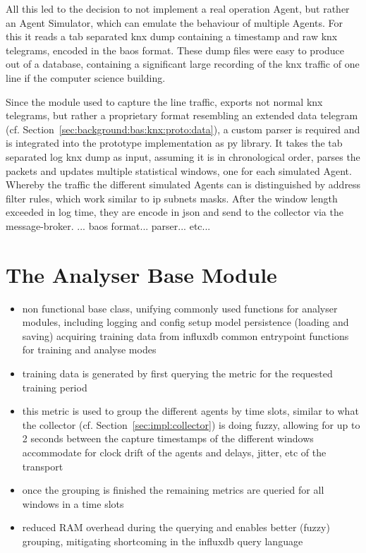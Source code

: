 All this led to the decision to not implement a real operation Agent, but rather an Agent Simulator, which can emulate the behaviour of multiple Agents.
For this it reads a tab separated \gls{knx} dump containing a timestamp and raw \gls{knx} telegrams, encoded in the \gls{baos} format.
These dump files were easy to produce out of a database, containing a significant large recording of the \gls{knx} traffic of one line if the computer science building.

Since the module used to capture the line traffic, exports not normal \gls{knx} telegrams, but rather a proprietary format resembling an extended data telegram (cf. Section~\ref{sec:background:bas:knx:proto:data}), a custom parser is required and is integrated into the prototype implementation as \gls{py} library.
It takes the tab separated log \gls{knx} dump as input, assuming it is in chronological order, parses the packets and updates multiple statistical windows, one for each simulated Agent. Whereby the traffic the different simulated Agents can is distinguished by address filter rules, which work similar to \gls{ip} subnets masks. 
After the window length exceeded in log time, they are encode in \gls{json} and send to the collector via the message-broker.
... baos format... parser... etc...

\section{The Analyser Base Module}
\label{sec:impl:base}

\begin{itemize}
	\item non functional base class, unifying commonly used functions for analyser modules, including
		\subitem logging and config setup
		\subitem model persistence (loading and saving)
		\subitem acquiring training data from \gls{influxdb}
		\subitem common entrypoint functions for training and analyse modes
	\item training data is generated by first querying the  metric for the requested training period
	\item this metric is used to group the different agents by time slots, similar to what the collector (cf. Section~\ref{sec:impl:collector}) is doing
		\subitem fuzzy, allowing for up to 2 seconds between the capture timestamps of the different windows
		\subitem accommodate for clock drift of the agents and delays, jitter, etc of the transport
	\item once the grouping is finished the remaining metrics are queried for all windows in a time slots
	\item reduced RAM overhead during the querying and enables better (fuzzy) grouping, mitigating shortcoming in the \gls{influxdb} query language
\end{itemize}

